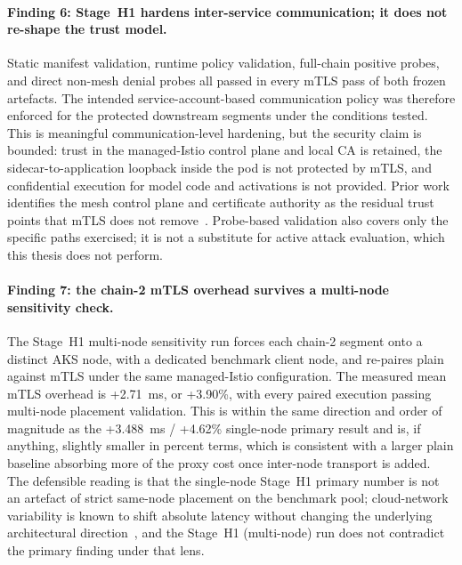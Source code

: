 \paragraph{Finding 6: Stage~H1 hardens inter-service communication; it does not
re-shape the trust model.}
Static manifest validation, runtime policy validation, full-chain positive
probes, and direct non-mesh denial probes all passed in every mTLS pass of
both frozen artefacts. The intended service-account-based communication
policy was therefore enforced for the protected downstream segments under
the conditions tested. This is meaningful communication-level hardening, but
the security claim is bounded: trust in the managed-Istio control plane and
local CA is retained, the sidecar-to-application loopback inside the pod is
not protected by mTLS, and confidential execution for model code and
activations is not provided. Prior work identifies the mesh control plane
and certificate authority as the residual trust points that mTLS does not
remove~\cite{poudel2025mazu}. Probe-based validation also covers only the
specific paths exercised; it is not a substitute for active attack
evaluation, which this thesis does not perform.

\paragraph{Finding 7: the chain-2 mTLS overhead survives a multi-node
sensitivity check.}
The Stage~H1 multi-node sensitivity run forces each chain-2 segment onto a
distinct AKS node, with a dedicated benchmark client node, and re-paires
plain against mTLS under the same managed-Istio configuration. The measured
mean mTLS overhead is +2.71~ms, or +3.90\%, with every paired execution
passing multi-node placement validation. This is within the same direction
and order of magnitude as the +3.488~ms / +4.62\% single-node primary result
and is, if anything, slightly smaller in percent terms, which is consistent
with a larger plain baseline absorbing more of the proxy cost once
inter-node transport is added. The defensible reading is that the
single-node Stage~H1 primary number is not an artefact of strict same-node
placement on the benchmark pool; cloud-network variability is known to
shift absolute latency without changing the underlying architectural
direction~\cite{noise_in_clouds}, and the Stage~H1 (multi-node) run does not contradict the
primary finding under that lens.

